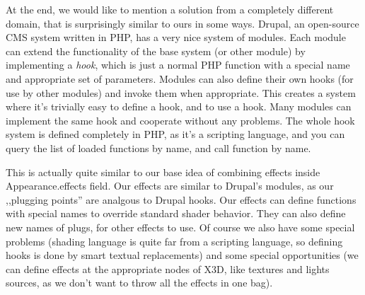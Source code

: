 \documentclass{acmsiggraph}                     %
\begin{document}

At the end, we would like to mention a solution from a completely
different domain, that is surprisingly similar to ours in some ways.
Drupal, an open-source CMS system written in PHP,
has a very nice system of modules. Each module
can extend the functionality of the base system (or other module)
by implementing a \textit{hook}, which is just a normal PHP function
with a special name and appropriate set of parameters. Modules can also define
their own hooks (for use by other modules) and invoke them when appropriate.
This creates a system where it's trivially easy to define a hook,
and to use a hook.
Many modules can implement the same hook and cooperate without any problems.
The whole hook system is defined completely in PHP, as it's a scripting
language, and you can query the list of loaded functions by name,
and call function by name.

This is actually quite similar to our base idea of combining effects
inside Appearance.effects field. Our effects are similar to
Drupal's modules, as our ,,plugging points'' are analgous to Drupal hooks.
Our effects can define functions with special names to override
standard shader behavior. They can also define new names of plugs, for other
effects to use. Of course we also have some special problems
(shading language is quite far from a scripting language,
so defining hooks is done by smart textual replacements)
and some special opportunities (we can define effects at
the appropriate nodes of X3D, like textures and lights sources,
as we don't want to throw all the effects in one bag).
\end{document}
